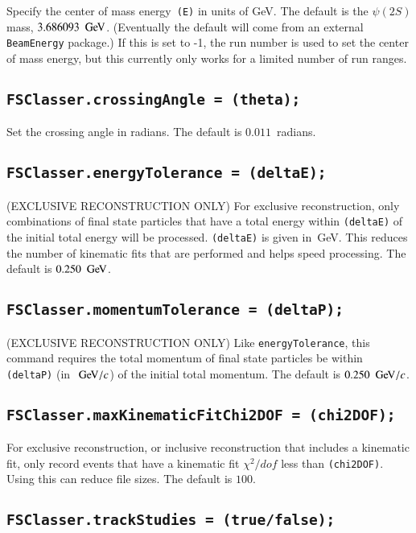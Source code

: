 \documentclass[11pt,a4paper]{define/cepcnote}
\begin{document}
Specify the center of mass energy~{\tt (E)} in units of GeV.  The default is the $\psi(2S)$ mass, $3.686093~\gev$.  (Eventually the default will come from an external {\tt BeamEnergy} package.)  If this is set to -1, the run number is used to set the center of mass energy, but this currently only works for a limited number of run ranges.

\subsection{\tt FSClasser.crossingAngle = (theta);}

Set the crossing angle in radians.  The default is $0.011$~radians.

\subsection{\tt FSClasser.energyTolerance = (deltaE);}

(EXCLUSIVE RECONSTRUCTION ONLY) For exclusive reconstruction, only combinations of final state particles that have a total energy within {\tt (deltaE)} of the initial total energy will be processed.  {\tt (deltaE)} is given in~GeV.  This reduces the number of kinematic fits that are performed and helps speed processing.  The default is $0.250~\gev$.

\subsection{\tt FSClasser.momentumTolerance = (deltaP);}

(EXCLUSIVE RECONSTRUCTION ONLY) Like {\tt energyTolerance}, this command requires the total momentum of final state particles be within {\tt (deltaP)} (in~$\gevc$) of the initial total momentum.  The default is $0.250~\gevc$.

\subsection{\tt FSClasser.maxKinematicFitChi2DOF = (chi2DOF);}

For exclusive reconstruction, or inclusive reconstruction that includes a kinematic fit, only record events that have a kinematic fit $\chi^2/dof$ less than {\tt (chi2DOF)}.  Using this can reduce file sizes.  The default is $100$.


\subsection{\tt FSClasser.trackStudies = (true/false);}
\label{sec:trackparameter}
\end{document}
